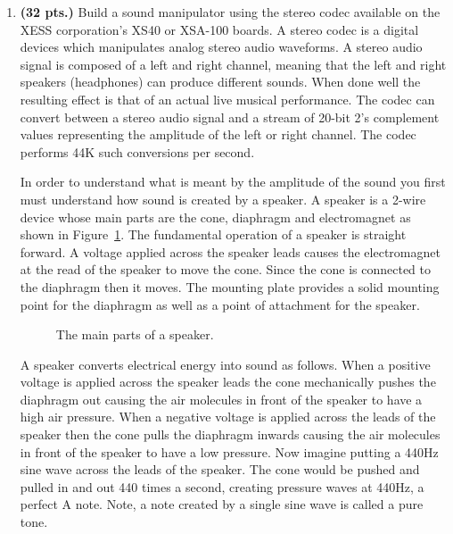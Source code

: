 \begin{enumerate}
In recall mode the digital circuit cycles through the patterns
stored during the program mode.  The circuit should not cycle 
through any unused patterns.  The speed of the light animation
can be changed by pressing the EVENT button.  The speed should
cycle between 1 of 4 different values (1hz, 2hz, 4hz, and 8 hz).

You will need to make sure to include wait states in the FSM
in order to allow the user to remove their finger from the
button before completing a state transition.

Turn in; an algorithm
the datapath and control unit,
the control word table,
the memory input equations, and
output equations.
The control unit is to be implemented using a ones hot encoding.


\item \textbf{(32 pts.)}
Build a sound manipulator using the stereo codec available on the
XESS corporation's XS40 or XSA-100 boards.  A stereo codec is a digital
devices which manipulates analog stereo audio waveforms.  A stereo audio signal
is composed of a left and right channel, meaning that the left and right
speakers (headphones) can produce different sounds.  When done well the
resulting effect is that of an actual live
musical performance.  The codec can convert between a stereo audio signal 
and a stream of 20-bit 2's complement values representing the amplitude
of the left or right channel.  The codec performs 44K such conversions 
per second.
 
In order to understand what is meant by the amplitude of the sound you first
must understand how sound is created by a speaker.  A speaker is a 2-wire
device whose main parts are the cone, diaphragm and electromagnet as 
shown in Figure~\ref{fig:speaker}.  The fundamental operation of a speaker 
is straight forward.  A voltage applied across the speaker leads causes
the electromagnet at the read of the speaker to move the cone.  Since
the cone is connected to the diaphragm then it moves. The mounting 
plate provides a solid mounting point for the diaphragm as well as a point
of attachment for the speaker.

\begin{figure}[ht]
\caption{The main parts of a speaker.}
\label{fig:speaker}
\end{figure}


A speaker converts electrical energy into sound as follows.  When a positive 
voltage is applied across the speaker leads the cone mechanically pushes 
the diaphragm out causing the air molecules in front of the  speaker to 
have a high air pressure.  When a negative voltage is 
applied across the leads of the speaker then the cone pulls the diaphragm 
inwards causing the air molecules in front of the speaker to have a low 
pressure.  Now imagine putting a 440Hz
sine wave across the leads of the speaker. The cone would be pushed and 
pulled in and out 440 times a second, creating pressure waves at 440Hz,
a perfect A note.  Note, a note created by a single sine wave is called 
a pure tone.


\end{enumerate}
